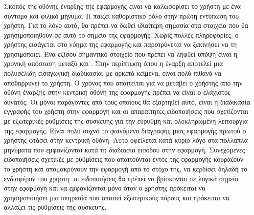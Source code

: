 \subsubsection{}
Σκοπός της οθόνης έναρξης της εφαρμογής είναι να καλωσορίσει το χρήστη με ένα σύντομο και φιλικό μήνυμα. Η  παίζει καθοριστικό ρόλο στην πρώτη εντύπωση του χρήστη.  Για το λόγο αυτό, θα πρέπει να δωθεί ιδιαίτερη σημασία στα στοιχεία που θα χρησιμοποιηθούν σε αυτό το σημείο της εφαρμογής. Χωρίς πολλές πληροφορίες, ο χρήστης εισάγεται στο νόημα της εφαρμογής και παροτρύνεται να ξεκινήσει να τη χρησιμοποιεί. \newline
\indent
Ένα εξίσου σημαντικό στοιχείο που πρέπει να ληφθεί υπόψη είναι η χρονική απόσταση μεταξύ  και . Στην περίπτωση όπου η έναρξη αποτελεί μια πολυσέλιδη εισαγωγική διαδικασία, με αρκετά κείμενα, είναι πολύ πιθανό να αποθαρρυνει το χρήστη. Ο χρόνος που απαιτείται για να μεταβεί ο χρήστης από την οθόνη έναρξης στην κεντρική οθόνη της εφαρμογής πρέπει να είναι ο ελάχιστος δυνατός. Οι μόνοι παράγοντες από τους οποίους θα εξαρτηθεί αυτό, είναι η διαδικασία εγγραφής του χρήστη στην εφαρμογή και οι απαραίτητες ειδοποιήσεις που σχετίζονται με εξωτερικές ρυθμίσεις της συσκευής για την εύρυθμη και ολοκληρωμένη λειτουργία της εφαρμογής. \newline
\indent
Είναι πολύ συχνό το φαινόμενο διαγραφής μιας εφαρμογής πρωτού ο χρήστης φτάσει στην κεντρική οθόνη. Αυτό οφείλεται κατά κύριο λόγο στα πολλαπλά μηνύματα που εμφανίζονται κατά τη διαδιασία εισόδου στην εφαρμογή. Συνεχόμενες ειδοποιήσεις σχετικές με ρυθμίσεις που απαιτούνται εντός της εφαρμογής κουράζουν το χρήστη και απομακρύνουν την εφαρμογή από το στόχο της, να κερδίσει δηλαδή το ενδιαφέρον του χρήστη. οι ειδοποιήσεις θα πρέπει να βρίσκονται σε λογικά σημεία στην εφαρμογή και να εμφανίζονται μόνο όταν ο χρήστης πρόκειται να χρησιμοποιήσει μια υπηρεσία που απαιτεί εξωτερικούς πόρους και πρόκειται να αλλάξει τις ρυθμίσεις της συσκευής.


